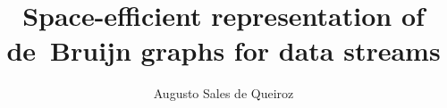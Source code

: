 \documentclass[bsc,en,scr]{ufpethesis}
\institute{Centro de Informática}
\author{Augusto Sales de Queiroz}
\title{Space-efficient representation of de~Bruijn graphs for data streams}
\begin{document}
    \frontmatter
    \frontpage
    \presentationpage





\linenumbers
\doublespacing

    
    

    \tableofcontents
    \listoffigures

    \mainmatter
    
    
    
    
    

    \backmatter
    
    
\end{document}
